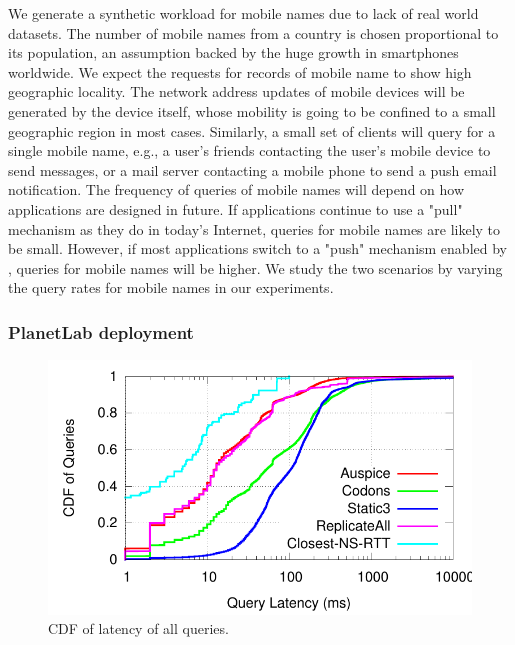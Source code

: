 We generate a synthetic workload for mobile names due to lack of real world datasets. 
The number of mobile names from a country is chosen proportional to its population, an assumption backed by the huge growth in smartphones worldwide. 
We expect the requests for  records of mobile name to show high geographic locality.
The network address updates of mobile devices will be generated by the device itself,  whose mobility is going to be confined to a small geographic region in most cases.
Similarly, a small set of clients will query for a single mobile name, e.g., a user's friends contacting the user's mobile device to send messages, or a mail server contacting a mobile phone to send a push email notification. 
The frequency of queries of mobile names will depend on how applications are designed in future. If applications continue to use a "pull" mechanism as they do in today's Internet, queries for mobile names are likely to be small. However, if most applications switch to a "push" mechanism enabled by \auspice, queries for mobile names will be higher. 
We study the two scenarios by varying the query rates for mobile names in our experiments.


\subsubsection{PlanetLab deployment}


\begin{figure}
\includegraphics[scale=0.6]{graph/system-exp/cdf-comparison.pdf}
\caption{CDF of latency of all queries.}
\label{fig:querylatencycdf}
\end{figure}

